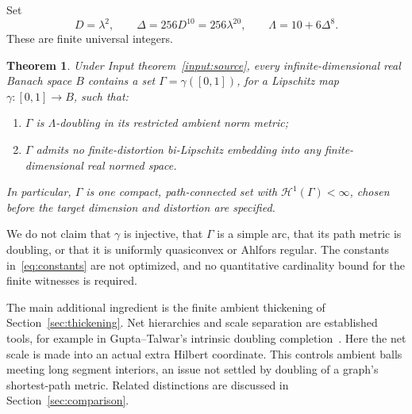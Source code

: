 \documentclass[11pt,a4paper]{article}
\newtheorem{maintheorem}{Theorem}
\theoremstyle{definition}
\theoremstyle{remark}
\numberwithin{equation}{section}
\newcommand{\HH}{\mathcal H}
\begin{document}
Set
\begin{equation}\label{eq:constants}
 D=\lambda^2,\qquad \Delta=256D^{10}=256\lambda^{20},\qquad
 \Lambda=10+6\Delta^8.
\end{equation}
These are finite universal integers.
\begin{maintheorem}\label{thm:main}
Under Input theorem~\ref{input:source}, every infinite-dimensional real Banach space $B$ contains a set $\Gamma=\gamma([0,1])$, for a Lipschitz map $\gamma:[0,1]\to B$, such that:
\begin{enumerate}
\item $\Gamma$ is $\Lambda$-doubling in its restricted ambient norm metric;
\item $\Gamma$ admits no finite-distortion bi-Lipschitz embedding into any finite-dimensional real normed space.
\end{enumerate}
In particular, $\Gamma$ is one compact, path-connected set with $\HH^1(\Gamma)<\infty$, chosen before the target dimension and distortion are specified.
\end{maintheorem}
We do not claim that $\gamma$ is injective, that $\Gamma$ is a simple arc, that its path metric is doubling, or that it is uniformly quasiconvex or Ahlfors regular. The constants in~\eqref{eq:constants} are not optimized, and no quantitative cardinality bound for the finite witnesses is required.

The main additional ingredient is the finite ambient thickening of Section~\ref{sec:thickening}. Net hierarchies and scale separation are established tools, for example in Gupta--Talwar's intrinsic doubling completion~\cite{GT}. Here the net scale is made into an actual extra Hilbert coordinate. This controls ambient balls meeting long segment interiors, an issue not settled by doubling of a graph's shortest-path metric. Related distinctions are discussed in Section~\ref{sec:comparison}.
\end{document}

